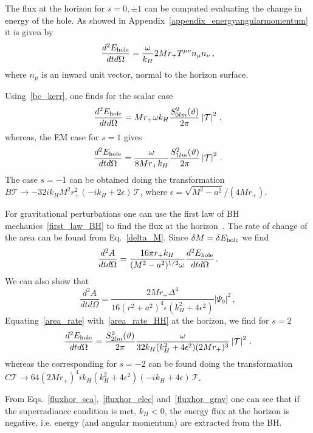 \documentclass[11pt]{article}
\newcommand{\be}{\begin{equation}}
\newcommand{\ee}{\end{equation}}
\numberwithin{equation}{section} %
\begin{document}
The flux at the horizon for $s=0, \pm 1$ can be computed evaluating the change in energy of the hole. As showed in Appendix~\ref{appendix_energyangularmomentum} it is given by
%
\be
\frac{d^2E_{\rm hole}}{dtd\Omega}=\frac{\omega}{k_H}2Mr_+ T^{\mu\nu}n_{\mu}n_{\nu}\,,
\ee
%
where $n_{\mu}$ is an inward unit vector, normal to the horizon surface.

Using~\eqref{bc_kerr}, one finds for the scalar case
%
\be\label{fluxhor_sca}
\frac{d^2E_{\rm hole}}{dtd\Omega}=M r_+ \omega k_H\frac{S_{0lm}^2(\vartheta)}{2\pi}\left|\mathcal{T}\right|^2\,,
\ee
% 
whereas, the EM case for $s=1$ gives 
%
\be\label{fluxhor_elec}
\frac{d^2E_{\rm hole}}{dtd\Omega}=\frac{\omega}{8M r_+ k_H}\frac{S_{1lm}^2(\vartheta)}{2\pi}\left|\mathcal{T}\right|^2\,.
\ee
The case $s=-1$ can be obtained doing the transformation $B\mathcal{T}\to -32ik_H M^2r_+^2(-ik_H+2\epsilon)\, \mathcal{T}$, where $\epsilon=\sqrt{M^2-a^2}/(4Mr_+)$.

For gravitational perturbations one can use the first law of BH mechanics~\eqref{first_law_BH} to find the flux at the horizon~\cite{Hawking:1972hy}. The rate of change of the area can be found from Eq.~\eqref{delta_M}. Since $\delta M=\delta E_{\rm hole}$ we find
%
\be\label{area_rate}
\frac{d^2A}{dtd\Omega}=\frac{16\pi r_+k_H}{(M^2-a^2)^{1/2}\omega}\frac{d^2E_{\rm hole}}{dtd\Omega}\,.
\ee
%
We can also show that~\cite{Hawking:1972hy}
%
\be\label{area_rate_HH}
\frac{d^2A}{dtd\Omega}=\frac{2Mr_+\Delta^4}{16(r^2+a^2)^4\epsilon(k_H^2+4\epsilon^2)}\left|\Psi_0\right|^2\,,
\ee
%
Equating~\eqref{area_rate} with~\eqref{area_rate_HH} at the horizon, we find for $s=2$ 
%
\be
\frac{d^2E_{\rm hole}}{dtd\Omega}=\frac{S_{2lm}^2(\vartheta)}{2\pi}\frac{\omega}{32k_H(k_H^2+4\epsilon^2)(2Mr_+)^3}\left|\mathcal{T}\right|^2\,.\label{fluxhor_grav}
\ee
% 
whereas the corresponding for $s=-2$ can be found doing the transformation $C\mathcal{T}\to 64(2Mr_+)^4 ik_H (k_H^2+4\epsilon^2)(-ik_H+4\epsilon)\,\mathcal{T}$. 

From Eqs.~\eqref{fluxhor_sca},~\eqref{fluxhor_elec} and~\eqref{fluxhor_grav} one can see that if the superradiance condition is met, $k_H<0$, the energy flux at the horizon is negative, i.e. energy (and angular momentum) are extracted from the BH.
%
\end{document}
